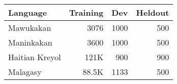 
\begin{tabular}{lrrr}
\toprule
Language & Training & Dev & Heldout \\
\toprule
Mawukakan & 3076 & 1000 & 500  \\
Maninkakan & 3600 & 1000 & 500  \\
Haitian Kreyol & 121K & 900 & 900  \\
Malagasy & 88.5K & 1133 & 500  \\
\bottomrule
\end{tabular}

